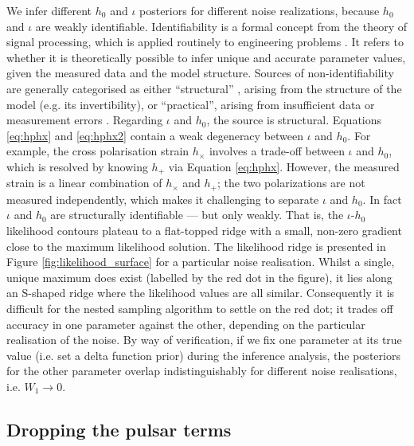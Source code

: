 \documentclass[fleqn,usenatbib,useAMS]{mnras}
\begin{document}
We infer different $h_0$ and $\iota$ posteriors for different noise realizations, because $h_0$ and $\iota$ are weakly identifiable. Identifiability is a formal concept from the theory of signal processing, which is applied routinely to engineering problems \citep{e5be7c83a0d24500826f6e1b414d1733}. It refers to whether it is theoretically possible to infer unique and accurate parameter values, given the measured data and the model structure. Sources of non-identifiability are generally categorised as either ``structural'' , arising from the structure of the model (e.g. its invertibility), or ``practical'', arising from insufficient data or measurement errors \citep{GUILLAUME2019418}. Regarding $\iota$ and $h_0$, the source is structural. Equations \eqref{eq:hphx} and \eqref{eq:hphx2} contain a weak degeneracy between $\iota$ and $h_0$. For example, the cross polarisation strain $h_{\times}$ involves a trade-off between $\iota$ and $h_0$, which is resolved by knowing $h_+$ via Equation \eqref{eq:hphx}. However, the measured strain is a linear combination of $h_\times$ and $h_+$; the two polarizations are not measured independently, which makes it challenging to separate $\iota$ and $h_0$. In fact $\iota$ and $h_0$ are structurally identifiable --- but only weakly. That is, the $\iota$-$h_0$ likelihood contours plateau to a flat-topped ridge with a small, non-zero gradient close to the maximum likelihood solution. The likelihood ridge is presented in Figure \ref{fig:likelihood_surface} for a particular noise realisation. Whilst a single, unique maximum does exist (labelled by the red dot in the figure), it lies along an S-shaped ridge where the likelihood values are all similar. Consequently it is difficult for the nested sampling algorithm to settle on the red dot; it trades off accuracy in one parameter against the other, depending on the particular realisation of the noise. By way of verification, if we fix one parameter at its true value (i.e. set a delta function prior) during the inference analysis, the posteriors for the other parameter overlap indistinguishably  for different noise realisations, i.e. $W_1 \to 0$. 


\subsection{Dropping the pulsar terms}\label{sec:pulsar_terms_drop}
\end{document}
